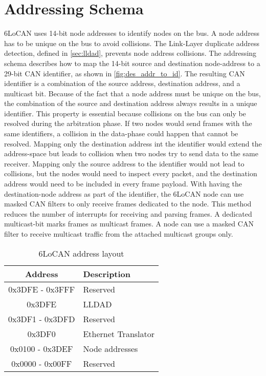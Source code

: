 \section{Addressing Schema}
\label{sec:addressing_schema}



6LoCAN uses 14-bit node addresses to identify nodes on the bus.
A node address has to be unique on the bus to avoid collisions.
The Link-Layer duplicate address detection, defined in \autoref{sec:lldad}, prevents node address collisions.
The addressing schema describes how to map the 14-bit source and destination node-address to a 29-bit CAN identifier, as shown in \autoref{fig:des_addr_to_id}.
The resulting CAN identifier is a combination of the source address, destination address, and a multicast bit.
Because of the fact that a node address must be unique on the bus, the combination of the source and destination address always results in a unique identifier.
This property is essential because collisions on the bus can only be resolved during the arbitration phase.
If two nodes would send frames with the same identifiers, a collision in the data-phase could happen that cannot be resolved.
Mapping only the destination address int the identifier would extend the address-space but leads to collision when two nodes try to send data to the same receiver.
Mapping only the source address to the identifier would not lead to collisions, but the nodes would need to inspect every packet, and the destination address would need to be included in every frame payload.
With having the destination-node address as part of the identifier, the 6LoCAN node can use masked CAN filters to only receive frames dedicated to the node.
This method reduces the number of interrupts for receiving and parsing frames.
A dedicated multicast-bit marks frames as multicast frames.
A node can use a masked CAN filter to receive multicast traffic from the attached multicast groups only.

\begin{table}
	\centering
	\caption{6LoCAN address layout}
	\begin{tabular}{|c|l|} \hline
	Address         & Description         \\ \hline \hline
	0x3DFE - 0x3FFF & Reserved            \\ \hline
	0x3DFE          & LLDAD               \\ \hline
        0x3DF1 - 0x3DFD & Reserved            \\ \hline
        0x3DF0          & Ethernet Translator \\ \hline
        0x0100 - 0x3DEF & Node addresses      \\ \hline
        0x0000 - 0x00FF & Reserved            \\ \hline
	\end{tabular}
        \label{tab:address_layout}
\end{table}

